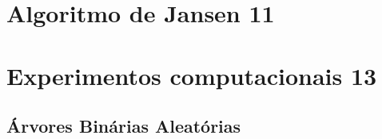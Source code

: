 \documentclass[a4paper,12pt]{article}
\begin{document}









\section {Algoritmo de Jansen 11}






\section {Experimentos computacionais 13}

	\subsection{Árvores Binárias Aleatórias}
\end{document}
